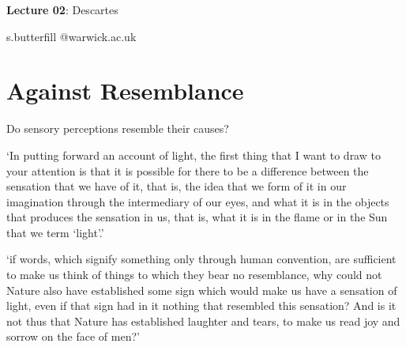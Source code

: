 \documentclass[12pt]{extarticle}
\date{}
\makeatletter
\def \ititle {Descartes}
\def \isubtitle {Lecture 02}
\def \iemail{s.butterfill @warwick.ac.uk}
\makeatother
\begin{document}
\begin{multicols*}{3}

\setlength\footnotesep{1em}









      
\def \ititle {Lecture 02}
 
\def \isubtitle {Descartes}
 
\begin{center}
 
{\Large
 
\textbf{\ititle}: \isubtitle
 
}
 
 
 
\iemail %
 
\end{center}
 





\section{Against Resemblance}
 
Do sensory perceptions resemble their causes?
 
‘In putting forward an account of light, the first thing that I want to draw to your attention 
is that it is possible for there to be a difference between the sensation that we have of it, 
that is, the idea that we form of it in our imagination through the intermediary of our eyes, 
and what it is in the objects that produces the sensation in us, that is, what it is in the flame 
or in the Sun that we term ‘light’.’
\citep[][p. 3 (AT 3)]{descartes:1998_world}
 
‘if words, which signify something only through human convention, are sufficient to make us think of
things to which they bear no resemblance, why could not Nature also have established some sign
which would make us have a sensation of light, even if that sign had in it nothing that resembled
this sensation? And is it not thus that Nature has established laughter and tears, to make us read
joy and sorrow on the face of men?’
\citep[][p. 4 (AT 4)]{descartes:1998_world}
 

\end{multicols*}
\end{document}
